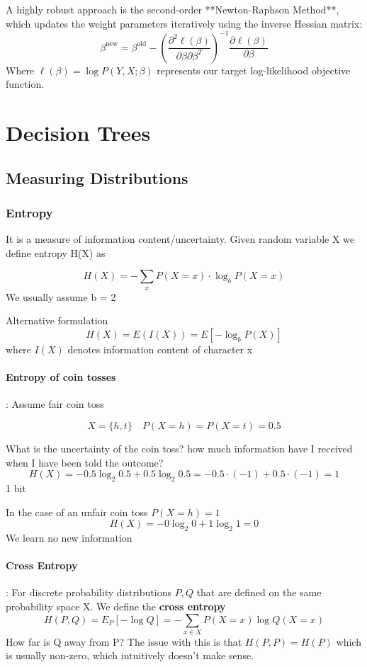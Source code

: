\documentclass{article}
\begin{document}
A highly robust approach is the second-order **Newton-Raphson Method**, which updates the weight parameters iteratively using the inverse Hessian matrix:
\[ \beta^{\text{new}} = \beta^{\text{old}} - \left( \frac{\partial^2 \ell(\beta)}{\partial \beta \partial \beta^T} \right)^{-1} \frac{\partial \ell(\beta)}{\partial \beta} \]
Where $\ell(\beta) = \log P(Y, X; \beta)$ represents our target log-likelihood objective function.

\section{Decision Trees}
\subsection{Measuring Distributions}
\subsubsection{Entropy}
It is a measure of information content/uncertainty. Given random variable X we define entropy H(X) as

\[H(X) = -\sum_{x} P(X = x) \cdot \log_bP(X = x)\]
We usually assume b = 2

Alternative formulation
\[H(X) = E(I(X)) = E[-\log_bP(X)]\]
where $I(X)$ denotes information content of character x

\paragraph{Entropy of coin tosses}: Assume fair coin toss

\[X = \{h,t\} \quad P(X = h) = P(X = t) = 0.5\]

What is the uncertainty of the coin toss? how much information have I received when I have been told the
outcome?
\[H(X) = -0.5 \log_2 0.5 + 0.5 \log_2 0.5 = - 0.5 \cdot (-1) + 0.5 \cdot (-1) = 1\]
1 bit

In the case of an unfair coin toss $P(X = h) = 1$ 
\[H(X) = -0 \log_2 0 + 1 \log_2 1 = 0\]
We learn no new information

\paragraph{Cross Entropy}: For discrete probability distributions $P,Q$ that are defined on the same probability space X. We define the \textbf{cross entropy}
\[H(P,Q) = E_P[-\log Q] = - \sum_{x\in X} P(X = x) \log Q(X = x)\]
How far is Q away from P? The issue with this is that $H(P,P) = H(P)$ which is usually non-zero, which intuitively doesn't make sense.
\end{document}
